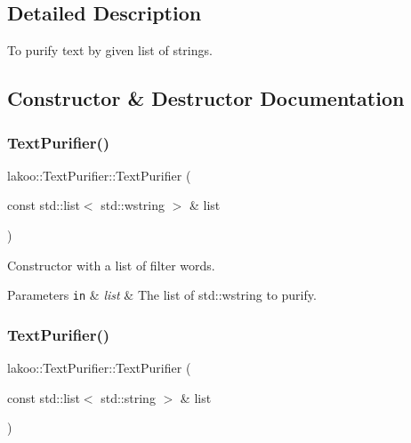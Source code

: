 \subsection{Detailed Description}
To purify text by given list of strings. 

\subsection{Constructor \& Destructor Documentation}
\mbox{\label{classlakoo_1_1_text_purifier_aabaa9cc28934e9ef8a930d6e821efdf3}} 
\subsubsection{\texorpdfstring{Text\+Purifier()}{TextPurifier()}\hspace{0.1cm}{\footnotesize\ttfamily [1/4]}}
{\footnotesize\ttfamily lakoo\+::\+Text\+Purifier\+::\+Text\+Purifier (\begin{DoxyParamCaption}\item[{const std\+::list$<$ std\+::wstring $>$ \&}]{list }\end{DoxyParamCaption})\hspace{0.3cm}{\ttfamily [explicit]}}



Constructor with a list of filter words. 


\begin{DoxyParams}[1]{Parameters}
\mbox{\tt in}  & {\em list} & The list of std\+::wstring to purify. \\
\hline
\end{DoxyParams}
\mbox{\label{classlakoo_1_1_text_purifier_aa0788313b1f9bcc6a96a0ccf09d8c839}} 
\subsubsection{\texorpdfstring{Text\+Purifier()}{TextPurifier()}\hspace{0.1cm}{\footnotesize\ttfamily [2/4]}}
{\footnotesize\ttfamily lakoo\+::\+Text\+Purifier\+::\+Text\+Purifier (\begin{DoxyParamCaption}\item[{const std\+::list$<$ std\+::string $>$ \&}]{list }\end{DoxyParamCaption})\hspace{0.3cm}{\ttfamily [explicit]}}

